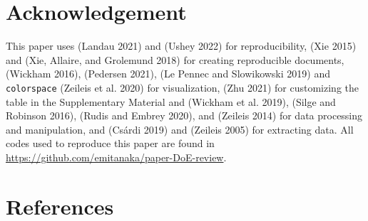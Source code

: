 \hypertarget{pkgs}{%
\section{Acknowledgement}\label{pkgs}}

This paper uses  (Landau 2021) and  (Ushey 2022) for reproducibility,  (Xie 2015) and  (Xie, Allaire, and Grolemund 2018) for creating reproducible documents,  (Wickham 2016),  (Pedersen 2021),  (Le Pennec and Slowikowski 2019) and \texttt{colorspace} (Zeileis et al. 2020) for visualization,  (Zhu 2021) for customizing the table in the Supplementary Material and  (Wickham et al. 2019),  (Silge and Robinson 2016),  (Rudis and Embrey 2020), and  (Zeileis 2014) for data processing and manipulation, and  (Csárdi 2019) and  (Zeileis 2005) for extracting data. All codes used to reproduce this paper are found in \url{https://github.com/emitanaka/paper-DoE-review}.

\hypertarget{references}{%
\section*{References}\label{references}}

